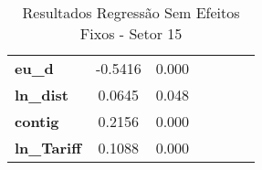 \begin{table}[ht]
\begin{center}
\begin{tabular}{lcccccc}
\textbf{eu\_d}                                                     &      -0.5416  &         0.000       \\
\textbf{ln\_dist}                                                  &       0.0645  &         0.048       \\
\textbf{contig}                                                    &       0.2156  &         0.000       \\
\textbf{ln\_Tariff}                                                &       0.1088  &         0.000       \\
\bottomrule
\end{tabular}
\caption{ Resultados Regressão Sem Efeitos Fixos - Setor 15}
\end{center}
\end{table}